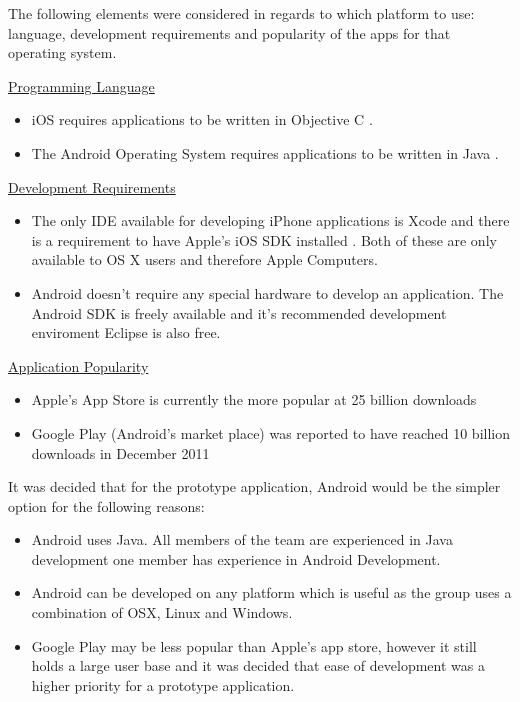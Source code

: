 The following elements were considered in regards to which platform to use: language, development requirements and popularity of the apps for that operating system.

\underline{Programming Language}
\begin{itemize}
	\item{iOS requires applications to be written in Objective C \cite{objectivec}.}
	\item{The Android Operating System requires applications to be written in Java \cite{AndroidSDK}.}
\end{itemize}

\underline{Development Requirements}
\begin{itemize}
	\item{The only IDE available for developing iPhone applications is Xcode and there is a requirement to have Apple's iOS SDK installed \cite{iOS}. Both of these are only available to OS X users and therefore Apple Computers.}
	\item{Android doesn't require any special hardware to develop an application. The Android SDK is freely available and it's recommended development enviroment Eclipse \cite{Eclipse} is also free.}
\end{itemize}

\underline{Application Popularity}
\begin{itemize}
	\item{Apple's App Store is currently the more popular at 25 billion downloads \cite{AppleDownload}}
	\item{Google Play (Android's market place) was reported to have reached 10 billion downloads in December 2011 \cite{AndroidDownload}}
\end{itemize}

It was decided that for the prototype application, Android would be the simpler option for the following reasons:
\begin{itemize}
	\item{Android uses Java. All members of the team are experienced in Java development one member has experience in Android Development.}
	\item{Android can be developed on any platform which is useful as the group uses a combination of OSX, Linux and Windows.}
	\item{Google Play may be less popular than Apple's app store, however it still holds a large user base and it was decided that ease of development was a higher priority for a prototype application.}
\end{itemize}

